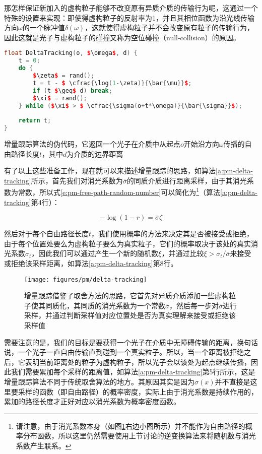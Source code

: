 那怎样保证新加入的虚构粒子能够不改变原有异质介质的传输行为呢，这通过一个特殊的设置来实现：即使得虚构粒子的反射率为1，并且其相位函数为沿光线传输方向$\omega$的一个脉冲值$\delta(\omega)$，这就使得虚构粒子并不会改变原有粒子的传输行为，因此这就是光子与虚构粒子的碰撞又称为空位碰撞（null-collision）的原因。

\begin{algorithm}
\begin{lstlisting}[language=C++, mathescape]
float DeltaTracking(o, $\omega$, d) {
	t = 0;
	do {
		$\zeta$ = rand();
		t = t - $ \cfrac{\log(1-\zeta)}{\bar{\mu}}$;
		if (t $\geq$ d) break;
		$\xi$ = rand();
	} while ($\xi$ > $ \cfrac{\sigma(o+t*\omega)}{\bar{\sigma}}$);
	
	return t;
}
\end{lstlisting}
\caption{增量跟踪算法的伪代码，它返回一个光子在介质中从起点$o$开始沿方向$\omega$传播的自由路径长度$t$，其中$d$为介质的边界距离}
\label{a:pm-delta-tracking}
\end{algorithm}

有了以上这些准备工作，现在就可以来描述增量跟踪的思路，如算法\ref{a:pm-delta-tracking}所示，首先我们对消光系数为$\bar{\sigma}$的同质介质进行距离采样，由于其消光系数为常数，所以式\ref{e:pm-free-path-random-number}可以简化为\footnote{请注意，由于消光系数本身（如图\ref{f:pm-delta-tracking}右边小图所示）并不能作为自由路径的概率分布函数，所以这里仍然需要使用上节讨论的逆变换算法来将随机数与消光系数产生联系。}（算法\ref{a:pm-delta-tracking}第4行）：

\begin{equation}
	-\log(1-r)=\bar{\sigma}\zeta
\end{equation}

然后对于每个自由路径长度$t$，我们使用概率的方法来决定其是否被接受或拒绝，由于每个位置处要么为虚构粒子要么为真实粒子，它们的概率取决于该处的真实消光系数$\sigma_t$，因此我们可以通过产生一个新的随机数$\xi$，并通过比较$\xi>\sigma_t/\bar{\sigma}$来接受或拒绝该采样距离，如算法\ref{a:pm-delta-tracking}第8行。

\begin{figure}
	\texttt{[image: figures/pm/delta-tracking]}
	\caption{增量跟踪借鉴了取舍方法的思路，它首先对异质介质添加一些虚构粒子使其同质化，其同质的消光系数为一个常数$\bar{\sigma}$，然后每一步对$\bar{\sigma}$进行采样，并通过判断采样值对应位置处是否为真实理解来接受或拒绝该采样值}
	\label{f:pm-delta-tracking}
\end{figure}

需要注意的是，我们的目标是要获得一个光子在介质中无障碍传输的距离，换句话说，一个光子一直自由传输直到碰到一个真实粒子。所以，当一个距离被拒绝之后，它表明当前距离处的粒子为虚构粒子，所以光子会以该处为起点继续传播，因此我们需要累加每个采样的距离值，如算法\ref{a:pm-delta-tracking}第5行所示，这是增量跟踪算法不同于传统取舍算法的地方。其原因其实是因为$\sigma(x)$并不直接是这里要采样的函数（即自由路径）的概率密度，实际上由于消光系数是持续作用的，累加的路径长度才正好对应以消光系数为概率密度函数。

